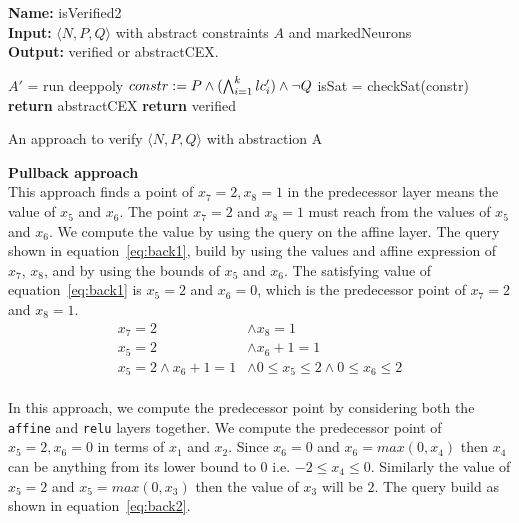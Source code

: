 \begin{algorithm}[t]
  \textbf{Name: } isVerified2 \\
  \textbf{Input: } $\langle N,P,Q \rangle$ with abstract constraints $A$ and markedNeurons \\
  \textbf{Output: } verified or  abstractCEX. 
  \begin{algorithmic}[1]
      \State $A'$ = run deeppoly
      \State $constr := P \land (\bigwedge_{i=1}^k lc'_i) \land \neg Q$ 
      \State isSat = checkSat(constr)
        \State \textbf{return} abstractCEX
      \EndIf
    \EndFor
    \State \textbf{return} verified
  \end{algorithmic}
  \caption{An approach to verify $\langle N,P,Q \rangle$ with abstraction A}
  \label{algo:verif2}
\end{algorithm}




\textbf{Pullback approach}\\
This approach finds a point of $x_7=2,x_8=1$ in the predecessor layer means the value of $x_5$ and $x_6$. 
The point $x_7=2$ and $x_8=1$ must reach from the values of $x_5$ and $x_6$. 
We compute the value by using the \sat{} query on the affine layer. The \sat{} query shown 
in equation~\ref{eq:back1}, 
build by using the values and affine expression of $x_7$, $x_8$, and by using the bounds of $x_5$ and $x_6$.
The satisfying value of equation~\ref{eq:back1} is $x_5=2$ and $x_6=0$, which is the predecessor point of $x_7=2$
and $x_8=1$.  
\begin{equation}
    \begin{aligned}
        x_7 = 2 & \land x_8 = 1 \\
        x_5 = 2 & \land x_6 + 1 = 1 \\ 
        x_5=2\land x_6+1 = 1 & \land 0\leq x_5 \leq 2 \land 0\leq x_6 \leq 2 \\
    \end{aligned}
\label{eq:back1}
\end{equation}

In this approach, we compute the predecessor point by considering both the \texttt{affine} and \texttt{relu} layers together. 
We compute the predecessor point of $x_5=2, x_6=0$ in terms of $x_1$ and $x_2$.
Since $x_6=0$ and $x_6=max(0,x_4)$ then $x_4$ can be anything from its lower bound to $0$ i.e. $-2 \leq x_4 \leq 0$.
Similarly the value of $x_5=2$ and $x_5=max(0,x_3)$ then the value of $x_3$ will be $2$. 
The \sat{} query build as shown in equation~\ref{eq:back2}. 


